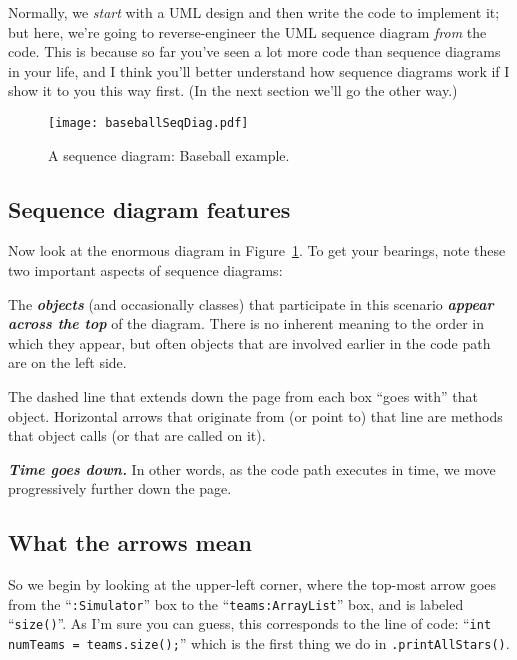 Normally, we \textit{start} with a UML design and then write the code to
implement it; but here, we're going to reverse-engineer the UML sequence
diagram \textit{from} the code. This is because so far you've seen a lot more
code than sequence diagrams in your life, and I think you'll better understand
how sequence diagrams work if I show it to you this way first. (In the next
section we'll go the other way.)

\begin{figure}
\centering
\texttt{[image: baseballSeqDiag.pdf]} %
\vspace{.1in}
\caption{A sequence diagram: Baseball example.}
\label{fig:baseballSeqDiag}
\end{figure}

\subsection{Sequence diagram features}

Now look at the enormous diagram in Figure~\ref{fig:baseballSeqDiag}. To get
your bearings, note these two important aspects of sequence diagrams:

\begin{compactitem}
\item The \textbf{\textit{objects}} (and occasionally classes) that
participate in this scenario \textbf{\textit{appear across the top}} of the
diagram. There is no inherent meaning to the order in which they appear, but
often objects that are involved earlier in the code path are on the left side.
\item The dashed line that extends down the page from each box ``goes with''
that object. Horizontal arrows that originate from (or point to) that line are
methods that object calls (or that are called on it).
\item \textit{\textbf{Time goes down.}} In other words, as the code path
executes in time, we move progressively further down the page.
\end{compactitem}

\subsection{What the arrows mean}

So we begin by looking at the upper-left corner, where the top-most arrow goes
from the ``\texttt{:Simulator}'' box to the ``\texttt{teams:ArrayList}'' box,
and is labeled ``\texttt{size()}''. As I'm sure you can guess, this corresponds
to the line of code: ``\texttt{int numTeams = teams.size();}'' which is the
first thing we do in \texttt{.printAllStars()}.

